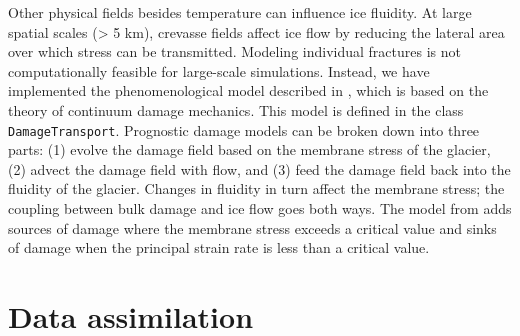 \documentclass[journal abbreviation, manuscript]{copernicus}
\begin{document}
Other physical fields besides temperature can influence ice fluidity.
At large spatial scales (> 5 km), crevasse fields affect ice flow by reducing the lateral area over which stress can be transmitted.
Modeling individual fractures is not computationally feasible for large-scale simulations.
Instead, we have implemented the phenomenological model described in \citet{albrecht2014fracture}, which is based on the theory of continuum damage mechanics.
This model is defined in the class \texttt{DamageTransport}.
Prognostic damage models can be broken down into three parts: (1) evolve the damage field based on the membrane stress of the glacier, (2) advect the damage field with flow, and (3) feed the damage field back into the fluidity of the glacier.
Changes in fluidity in turn affect the membrane stress; the coupling between bulk damage and ice flow goes both ways.
The model from \citet{albrecht2014fracture} adds sources of damage where the membrane stress exceeds a critical value and sinks of damage when the principal strain rate is less than a critical value.


\section{Data assimilation}
\end{document}
